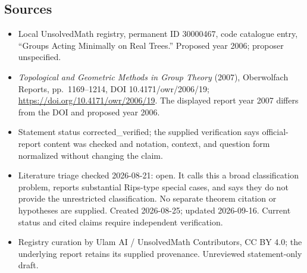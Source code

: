 \documentclass[11pt]{article}
\begin{document}
\subsection{Sources}
\begin{itemize}
\item Local UnsolvedMath registry, permanent ID 30000467, code catalogue entry, ``Groups Acting Minimally on Real Trees.'' Proposed year 2006; proposer unspecified.
\item \emph{Topological and Geometric Methods in Group Theory} (2007), Oberwolfach Reports, pp.\ 1169--1214, DOI 10.4171/owr/2006/19; \url{https://doi.org/10.4171/owr/2006/19}. The displayed report year 2007 differs from the DOI and proposed year 2006.
\item Statement status corrected\_verified; the supplied verification says official-report content was checked and notation, context, and question form normalized without changing the claim.
\item Literature triage checked 2026-08-21: open. It calls this a broad classification problem, reports substantial Rips-type special cases, and says they do not provide the unrestricted classification. No separate theorem citation or hypotheses are supplied. Created 2026-08-25; updated 2026-09-16. Current status and cited claims require independent verification.
\item Registry curation by Ulam AI / UnsolvedMath Contributors, CC BY 4.0; the underlying report retains its supplied provenance. Unreviewed statement-only draft.
\end{itemize}
\end{document}
